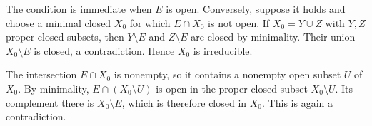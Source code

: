 The condition is immediate when $E$ is open. Conversely, suppose it holds and choose a minimal closed $X_0$ for which $E\cap X_0$ is not open. If $X_0=Y\cup Z$ with $Y,Z$ proper closed subsets, then $Y\setminus E$ and $Z\setminus E$ are closed by minimality. Their union $X_0\setminus E$ is closed, a contradiction. Hence $X_0$ is irreducible.

The intersection $E\cap X_0$ is nonempty, so it contains a nonempty open subset $U$ of $X_0$. By minimality, $E\cap(X_0\setminus U)$ is open in the proper closed subset $X_0\setminus U$. Its complement there is $X_0\setminus E$, which is therefore closed in $X_0$. This is again a contradiction.
